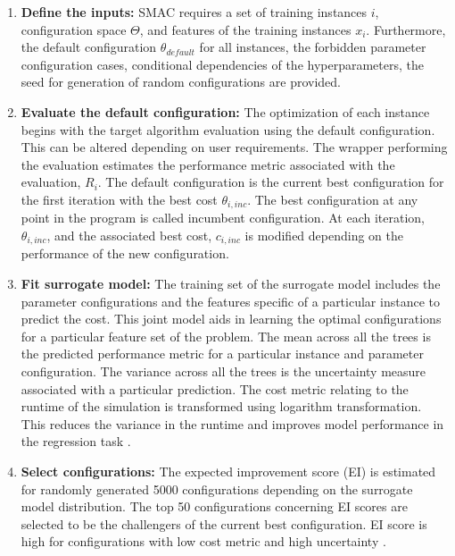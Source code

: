 \begin{enumerate}
\item \textbf{Define the inputs:} SMAC requires a set of training instances $i$, configuration space $\Theta$, and features of the training instances $x_i$. Furthermore, the default configuration $\theta_{default}$ for all instances, the forbidden parameter configuration cases, conditional dependencies of the hyperparameters, the seed for generation of random configurations are provided. 

\item \textbf{Evaluate the default configuration:} The optimization of each instance begins with the target algorithm evaluation using the default configuration. This can be altered depending on user requirements. The wrapper performing the evaluation estimates the performance metric associated with the evaluation, $R_i$. The default configuration is the current best configuration for the first iteration with the best cost $\theta_{i,inc}$. The best configuration at any point in the program is called incumbent configuration. At each iteration, $\theta_{i,inc}$, and the associated best cost, $c_{i,inc}$ is modified depending on the performance of the new configuration.

\item \textbf{Fit surrogate model:} The training set of the surrogate model includes the parameter configurations and the features specific of a particular instance to predict the cost. This joint model aids in learning the optimal configurations for a particular feature set of the problem. The mean across all the trees is the predicted performance metric for a particular instance and parameter configuration. The variance across all the trees is the uncertainty measure associated with a particular prediction. The cost metric relating to the runtime of the simulation is transformed using logarithm transformation. This reduces the variance in the runtime and improves model performance in the regression task \cite{SMAC_mainpaper} \cite{SATZILLA}. 

\item \textbf{Select configurations:} 
The expected improvement score (EI) is estimated for randomly generated 5000 configurations depending on the surrogate model distribution. The top 50 configurations concerning EI scores are selected to be the challengers of the current best configuration. EI score is high for configurations with low cost metric and high uncertainty \cite{SMAC_mainpaper} \cite{SMAC_extendedpaper}.  


\end{enumerate}
